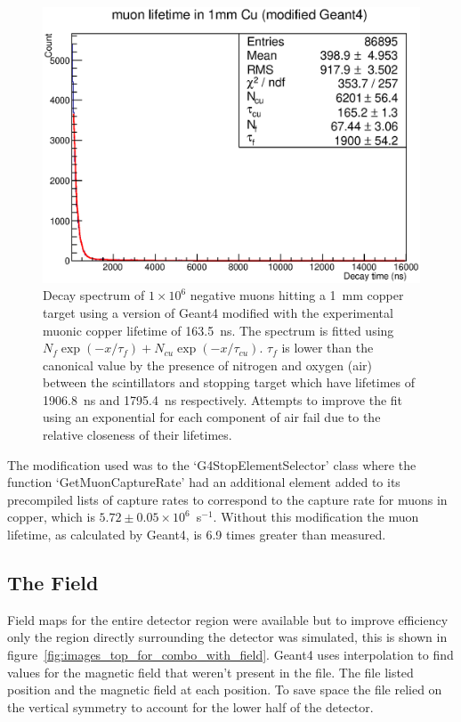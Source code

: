 \begin{figure}[hptb]
  \centering
    \includegraphics[width=.8\textwidth]{images/mu-_lifetime_in_cu_modded_g4.eps}
  \caption{Decay spectrum of \(1\times10^6\) negative muons hitting a 1~mm copper target using a version of Geant4 modified with the experimental muonic copper lifetime of 163.5~ns. The spectrum is fitted using \(N_f\exp(-x/\tau_f) +  N_{cu}\exp(-x/\tau_{cu})\). \(\tau_f\) is lower than the canonical value by the presence of nitrogen and oxygen (air) between the scintillators and stopping target which have lifetimes of 1906.8~ns and 1795.4~ns respectively. Attempts to improve the fit using an exponential for each component of air fail due to the relative closeness of their lifetimes.}
  \label{fig:images_mu-_lifetime_in_cu_modded_g4}
\end{figure}

The modification used was to the `G4StopElementSelector' class where the function `GetMuonCaptureRate' had an additional element added to its precompiled lists of capture rates to correspond to the capture rate for muons in copper, which is \(5.72\pm0.05\times10^6\)~s\(^{-1}\). Without this modification the muon lifetime, as calculated by Geant4, is 6.9 times greater than measured.

\subsection{The Field} %
\label{sec:the_field}
Field maps for the entire detector region were available but to improve efficiency only the region directly surrounding the detector was simulated, this is shown in figure~\ref{fig:images_top_for_combo_with_field}. Geant4 uses interpolation to find values for the magnetic field that weren't present in the file. The file listed position and the magnetic field at each position. To save space the file relied on the vertical symmetry to account for the lower half of the detector. 

